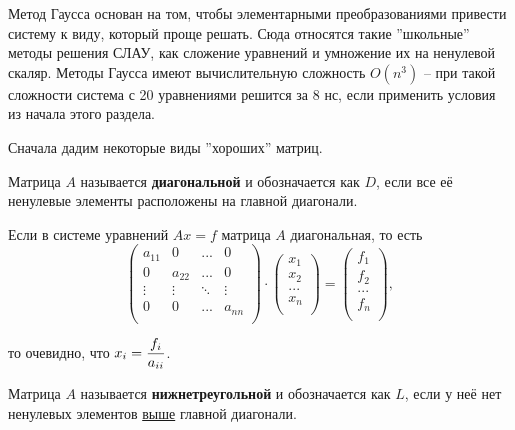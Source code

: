 \documentclass{article}
\begin{document}
Метод Гаусса основан на том, чтобы элементарными преобразованиями привести
систему к виду, который проще решать. Сюда относятся такие ''школьные'' методы
решения СЛАУ, как сложение уравнений и умножение их на ненулевой скаляр. Методы
Гаусса имеют вычислительную сложность $O(n^3)$ -- при такой сложности система
с 20 уравнениями решится за 8 нс, если применить условия из начала этого
раздела.

Сначала дадим некоторые виды ''хороших'' матриц.

\begin{define}\label{eq:diagonal_matrix}
	Матрица $A$ называется \textbf{диагональной} и обозначается как $D$,
	если все её ненулевые элементы расположены на главной диагонали.
\end{define}

Если в системе уравнений $Ax=f$ матрица $A$ диагональная, то есть
\[
	\begin{pmatrix}
		a_{11}	& 0	& ...	& 0 \\
		0	& a_{22}& ...	& 0 \\
		\vdots	& \vdots&\ddots &\vdots \\
		0	& 0	& ...	& a_{nn} \\
	\end{pmatrix}
	\cdot
	\begin{pmatrix}
		x_1 \\
		x_2 \\
		... \\
		x_n \\
	\end{pmatrix}
	=
	\begin{pmatrix}
		f_1 \\
		f_2 \\
		... \\
		f_n \\
	\end{pmatrix}
	,
\]

то очевидно, что $x_i=\mathlarger{\frac{f_i}{a_{ii}}}$.

\begin{define}
	Матрица $A$ называется \textbf{нижнетреугольной} и обозначается как $L$,
	если у неё нет ненулевых элементов \underline{выше} главной диагонали.
\end{define}

\newpage
\end{document}
